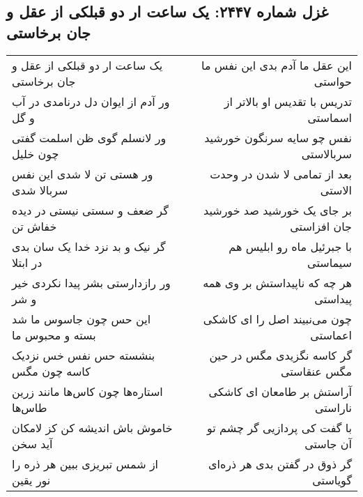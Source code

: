 \begin{center}
\section*{غزل شماره ۲۴۴۷: یک ساعت ار دو قبلکی از عقل و جان برخاستی}
\label{sec:2447}
\begin{longtable}{l p{0.5cm} r}
یک ساعت ار دو قبلکی از عقل و جان برخاستی
&&
این عقل ما آدم بدی این نفس ما حواستی
\\
ور آدم از ایوان دل درنامدی در آب و گل
&&
تدریس با تقدیس او بالاتر از اسماستی
\\
ور لانسلم گوی ظن اسلمت گفتی چون خلیل
&&
نفس چو سایه سرنگون خورشید سربالاستی
\\
ور هستی تن لا شدی این نفس سربالا شدی
&&
بعد از تمامی لا شدن در وحدت الاستی
\\
گر ضعف و سستی نیستی در دیده خفاش تن
&&
بر جای یک خورشید صد خورشید جان افزاستی
\\
گر نیک و بد نزد خدا یک سان بدی در ابتلا
&&
با جبرئیل ماه رو ابلیس هم سیماستی
\\
ور رازدارستی بشر پیدا نکردی خیر و شر
&&
هر چه که ناپیداستش بر وی همه پیداستی
\\
این حس چون جاسوس ما شد بسته و محبوس ما
&&
چون می‌نبیند اصل را ای کاشکی اعماستی
\\
بنشسته حس نفس خس نزدیک کاسه چون مگس
&&
گر کاسه نگزیدی مگس در حین مگس عنقاستی
\\
استاره‌ها چون کاس‌ها مانند زرین طاس‌ها
&&
آراستش بر طامعان ای کاشکی ناراستی
\\
خاموش باش اندیشه کن کز لامکان آید سخن
&&
با گفت کی پردازیی گر چشم تو آن جاستی
\\
از شمس تبریزی ببین هر ذره را نور یقین
&&
گر ذوق در گفتن بدی هر ذره‌ای گویاستی
\\
\end{longtable}
\end{center}
